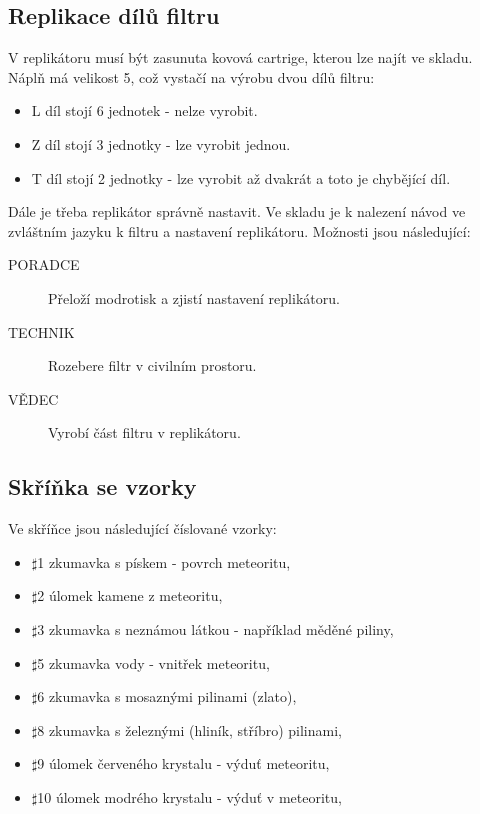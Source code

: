 \documentclass[11pt,oneside,a4paper]{article}
\begin{document}
\subsection{\texorpdfstring{Replikace dílů filtru}{Replikace dilu filtru}}
\label{subsec:replikace_dilu_filtru}
V replikátoru musí být zasunuta kovová cartrige, kterou lze najít ve skladu. Náplň má velikost 5, což vystačí na výrobu dvou dílů filtru:
\begin{itemize}
\item L díl stojí 6 jednotek - nelze vyrobit.
\item Z díl stojí 3 jednotky - lze vyrobit jednou.
\item T díl stojí 2 jednotky - lze vyrobit až dvakrát a toto je chybějící díl.
\end{itemize}
Dále je třeba replikátor správně nastavit. Ve skladu je k nalezení návod ve zvláštním jazyku k filtru a nastavení replikátoru. Možnosti jsou následující:
\begin{description}
\item[PORADCE] Přeloží modrotisk a zjistí nastavení replikátoru.
\item[TECHNIK] Rozebere filtr v civilním prostoru.
\item[VĚDEC] Vyrobí část filtru v replikátoru.
\end{description}

\subsection{\texorpdfstring{Skříňka se vzorky}{Skrinka se vzorky}}
\label{subsec:skrinka_se_vzorky}
Ve skříňce jsou následující číslované vzorky:
\begin{itemize}
\item $\sharp$1 zkumavka s pískem - povrch meteoritu,
\item $\sharp$2 úlomek kamene z meteoritu,
\item $\sharp$3 zkumavka s neznámou látkou - například měděné piliny,
\item $\sharp$5 zkumavka vody - vnitřek meteoritu,
\item $\sharp$6 zkumavka s mosaznými pilinami (zlato),
\item $\sharp$8 zkumavka s železnými (hliník, stříbro) pilinami,
\item $\sharp$9 úlomek červeného krystalu - výduť meteoritu,
\item $\sharp$10 úlomek modrého krystalu - výduť v meteoritu,
\end{itemize}
\end{document}
